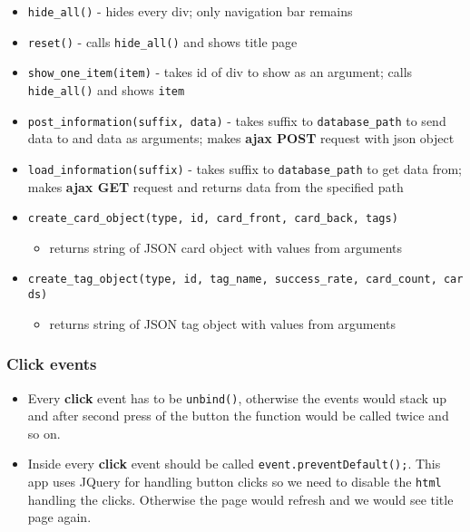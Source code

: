 \documentclass[12pt]{article}
\providecommand{\tightlist}{\setlength{\itemsep}{1pt}\setlength{\parskip}{1pt}}
\let\oldtexttt\texttt
\renewcommand{\texttt}[1]{\oldtexttt{\textcolor{codehighlight}{#1}}}
\begin{document}
\begin{itemize}
\tightlist
\item
  \texttt{hide\_all()} - hides every div; only navigation bar remains
\item
  \texttt{reset()} - calls \texttt{hide\_all()} and shows title page
\item
  \texttt{show\_one\_item(item)} - takes id of div to show as an
  argument; calls \texttt{hide\_all()} and shows \texttt{item}
\item
  \texttt{post\_information(suffix,\ data)} - takes suffix to
  \texttt{database\_path} to send data to and data as arguments; makes
  \textbf{ajax POST} request with json object
\item
  \texttt{load\_information(suffix)} - takes suffix to
  \texttt{database\_path} to get data from; makes \textbf{ajax GET}
  request and returns data from the specified path
\item
  \texttt{create\_card\_object(type,\ id,\ card\_front,\ card\_back,\ tags)}

  \begin{itemize}
  \tightlist
  \item
    returns string of JSON card object with values from arguments
  \end{itemize}
\item
  \texttt{create\_tag\_object(type,\ id,\ tag\_name,\ success\_rate,\ card\_count,\ cards)}

  \begin{itemize}
  \tightlist
  \item
    returns string of JSON tag object with values from arguments
  \end{itemize}
\end{itemize}

\hypertarget{click-events}{%
\subsubsection{Click events}\label{click-events}}

\begin{itemize}
\tightlist
\item
  Every \textbf{click} event has to be \texttt{unbind()}, otherwise the
  events would stack up and after second press of the button the
  function would be called twice and so on.
\item
  Inside every \textbf{click} event should be called
  \texttt{event.preventDefault();}. This app uses JQuery for handling
  button clicks so we need to disable the \texttt{html} handling the
  clicks. Otherwise the page would refresh and we would see title page
  again.
\end{itemize}
\end{document}
